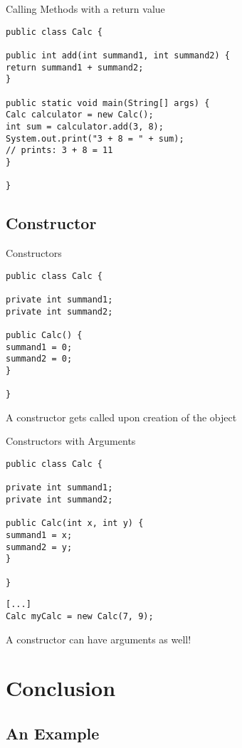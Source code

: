 \begin{frame}[fragile]{Calling Methods with a return value}
\begin{lstlisting}
public class Calc {

public int add(int summand1, int summand2) {
return summand1 + summand2;
}

public static void main(String[] args) {
Calc calculator = new Calc();
int sum = calculator.add(3, 8);
System.out.print("3 + 8 = " + sum); 
// prints: 3 + 8 = 11
}

}
\end{lstlisting}
\end{frame}

\subsection{Constructor}

\begin{frame}[fragile]{Constructors}
\begin{lstlisting}
public class Calc {

private int summand1;
private int summand2;

public Calc() {
summand1 = 0;
summand2 = 0;
}

}
\end{lstlisting}
A constructor gets called upon creation of the object
\end{frame}

\begin{frame}[fragile]{Constructors with Arguments}
\begin{lstlisting}
public class Calc {

private int summand1;
private int summand2;

public Calc(int x, int y) {
summand1 = x;
summand2 = y;
}

}
\end{lstlisting}
\begin{lstlisting}
[...]
Calc myCalc = new Calc(7, 9);
\end{lstlisting}

A constructor can have arguments as well!
\end{frame}

\section{Conclusion}
\subsection{An Example}

